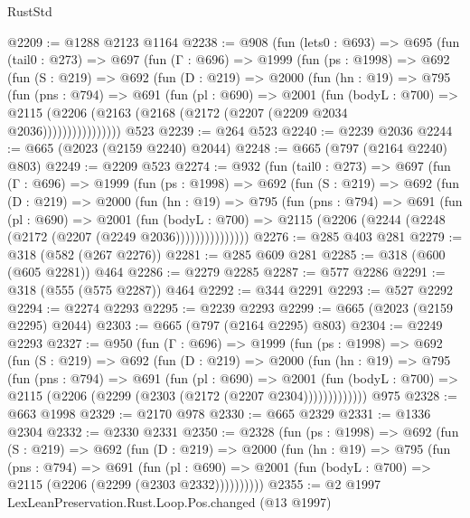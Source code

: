 \begin{lexlean}{RustStd}
\begin{coremodule}
{\begin{coremodule}
{{{{{{{@2209 := @1288 @2123 @1164
@2238 := @908
    (fun (lets0 : @693) =>
    @695
      (fun (tail0 : @273) =>
      @697
        (fun (Γ : @696) =>
        @1999
          (fun (ps : @1998) =>
          @692
            (fun (S : @219) =>
            @692
              (fun (D : @219) =>
              @2000
                (fun (hn : @19) =>
                @795
                  (fun (pns : @794) =>
                  @691
                    (fun (pl : @690) =>
                    @2001
                      (fun (bodyL : @700) =>
                      @2115 (@2206 (@2163 (@2168 (@2172 (@2207 (@2209 @2034 @2036))))))))))))))))
    @523
@2239 := @264 @523
@2240 := @2239 @2036
@2244 := @665 (@2023 (@2159 @2240) @2044)
@2248 := @665 (@797 (@2164 @2240) @803)
@2249 := @2209 @523
@2274 := @932
    (fun (tail0 : @273) =>
    @697
      (fun (Γ : @696) =>
      @1999
        (fun (ps : @1998) =>
        @692
          (fun (S : @219) =>
          @692
            (fun (D : @219) =>
            @2000
              (fun (hn : @19) =>
              @795
                (fun (pns : @794) =>
                @691
                  (fun (pl : @690) =>
                  @2001
                    (fun (bodyL : @700) =>
                    @2115 (@2206 (@2244 (@2248 (@2172 (@2207 (@2249 @2036)))))))))))))))
@2276 := @285 @403 @281
@2279 := @318 (@582 (@267 @2276))
@2281 := @285 @609 @281
@2285 := @318 (@600 (@605 @2281)) @464
@2286 := @2279 @2285
@2287 := @577 @2286
@2291 := @318 (@555 (@575 @2287)) @464
@2292 := @344 @2291
@2293 := @527 @2292
@2294 := @2274 @2293
@2295 := @2239 @2293
@2299 := @665 (@2023 (@2159 @2295) @2044)
@2303 := @665 (@797 (@2164 @2295) @803)
@2304 := @2249 @2293
@2327 := @950
    (fun (Γ : @696) =>
    @1999
      (fun (ps : @1998) =>
      @692
        (fun (S : @219) =>
        @692
          (fun (D : @219) =>
          @2000
            (fun (hn : @19) =>
            @795
              (fun (pns : @794) =>
              @691
                (fun (pl : @690) =>
                @2001
                  (fun (bodyL : @700) => @2115 (@2206 (@2299 (@2303 (@2172 (@2207 @2304)))))))))))))
    @975
@2328 := @663 @1998
@2329 := @2170 @978
@2330 := @665 @2329
@2331 := @1336 @2304
@2332 := @2330 @2331
@2350 := @2328
    (fun (ps : @1998) =>
    @692
      (fun (S : @219) =>
      @692
        (fun (D : @219) =>
        @2000
          (fun (hn : @19) =>
          @795
            (fun (pns : @794) =>
            @691
              (fun (pl : @690) =>
              @2001 (fun (bodyL : @700) => @2115 (@2206 (@2299 (@2303 @2332))))))))))
@2355 := @2 @1997 LexLeanPreservation.Rust.Loop.Pos.changed (@13 @1997)
}}}}}}}
\end{coremodule}}
\end{coremodule}
\end{lexlean}
